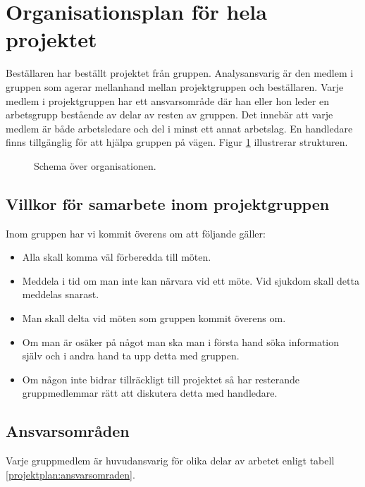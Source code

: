 \section{Organisationsplan för hela projektet}
Beställaren har beställt projektet från gruppen. Analysansvarig är den medlem i gruppen som agerar mellanhand mellan projektgruppen och beställaren. Varje medlem i projektgruppen har ett ansvarsområde där han eller hon leder en arbetsgrupp bestående av delar av resten av gruppen. Det innebär att varje medlem är både arbetsledare och del i minst ett annat arbetslag. En handledare finns tillgänglig för att hjälpa gruppen på vägen. Figur \ref{projektplan:organisationsplan} illustrerar strukturen.

\begin{figure}[H]
\center
{}%

%
\caption{Schema över organisationen.} \label{projektplan:organisationsplan}
\endcenter
\end{figure}

\subsection{Villkor för samarbete inom projektgruppen}
Inom gruppen har vi kommit överens om att följande gäller:
\begin{itemize}
\item{Alla skall komma väl förberedda till möten.}
\item{Meddela i tid om man inte kan närvara vid ett möte. Vid sjukdom skall detta meddelas snarast.}
\item{Man skall delta vid möten som gruppen kommit överens om.}
\item{Om man är osäker på något man ska man i första hand söka information själv och i andra hand ta upp detta med gruppen.}
\item{Om någon inte bidrar tillräckligt till projektet så har resterande gruppmedlemmar rätt att diskutera detta med handledare.}
\end{itemize}

\newpage
\subsection{Ansvarsområden}
Varje gruppmedlem är huvudansvarig för olika delar av arbetet enligt tabell \ref{projektplan:ansvarsomraden}.

